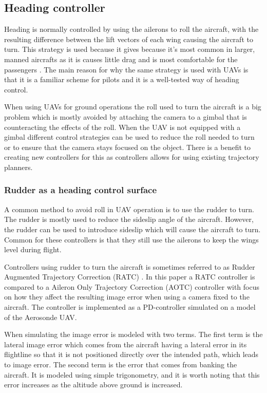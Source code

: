\subsection{Heading controller}
Heading is normally controlled by using the ailerons to roll the aircraft, with the resulting difference between the lift vectors of each wing causing the aircraft to turn. This strategy is used because it gives because it's most common in larger, manned aircrafts as it is causes little drag and is most comfortable for the passengers \cite{skidToTurnMills}. The main reason for why the same strategy is used with UAVs is that it is a familiar scheme for pilots and it is a well-tested way of heading control.

When using UAVs for ground operations the roll used to turn the aircraft is a big problem which is mostly avoided by attaching the camera to a gimbal that is counteracting the effects of the roll. When the UAV is not equipped with a gimbal different control strategies can be used to reduce the roll needed to turn or to ensure that the camera stays focused on the object. There is a benefit to creating new controllers for this as controllers allows for using existing trajectory planners.


\subsubsection{Rudder as a heading control surface}
A common method to avoid roll in UAV operation is to use the rudder to turn. The rudder is mostly used to reduce the sideslip angle of the aircraft. However, the rudder can be used to introduce sideslip which will cause the aircraft to turn. Common for these controllers is that they still use the ailerons to keep the wings level during flight.

Controllers using rudder to turn the aircraft is sometimes referred to as Rudder Augmented Trajectory Correction (RATC) \cite{ratcFISHER}. In this paper a RATC controller is compared to a Aileron Only Trajectory Correction (AOTC) controller with focus on how they affect the resulting image error when using a camera fixed to the aircraft. The controller is implemented as a PD-controller simulated on a model of the Aerosonde UAV.

When simulating the image error is modeled with two terms. The first term is the lateral image error which comes from the aircraft having a lateral error in its flightline so that it is not positioned directly over the intended path, which leads to image error. The second term is the error that comes from banking the aircraft. It is modeled using simple trigonometry, and it is worth noting that this error increases as the altitude above ground is increased.

